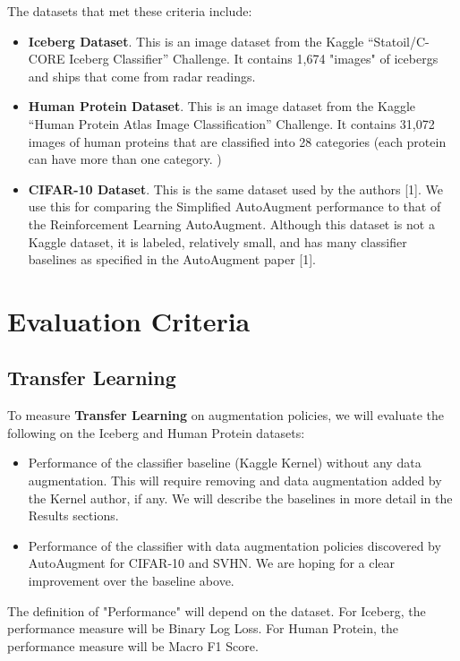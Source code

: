 \documentclass[10pt,twocolumn,letterpaper]{article}
\begin{document}
The datasets that met these criteria include:

\begin{itemize}
  \item \textbf{Iceberg Dataset}.  This is an image dataset from the Kaggle “Statoil/C-CORE Iceberg Classifier” Challenge.  It contains 1,674 "images" of icebergs and ships that come from radar readings.  
  \item \textbf{Human Protein Dataset}.  This is an image dataset from the Kaggle “Human Protein Atlas Image Classification” Challenge.   It contains 31,072 images of human proteins that are classified into 28 categories (each protein can have more than one  category. )
  \item \textbf{CIFAR-10 Dataset}.  This is the same dataset used by the authors [1].  We use this for comparing the Simplified AutoAugment performance to that of the Reinforcement Learning AutoAugment.  Although this dataset is not a Kaggle dataset, it is labeled, relatively small, and has many classifier baselines as specified in the AutoAugment paper [1].        
\end{itemize}


\section{Evaluation Criteria}

\subsection{Transfer Learning}

To measure \textbf{Transfer Learning} on augmentation policies, we will evaluate the following on the Iceberg and Human Protein datasets:

\begin{itemize}
  \item Performance of the classifier baseline (Kaggle Kernel) without any data augmentation.  This will require removing and data augmentation added by the Kernel author, if any.  We will describe the baselines in more detail in the Results sections.
  \item Performance of the classifier with data augmentation policies discovered by AutoAugment for CIFAR-10 and SVHN.  We are hoping for a clear improvement over the baseline above.
\end{itemize}

The definition of "Performance" will depend on the dataset.  For Iceberg, the performance measure will be Binary Log Loss.  For Human Protein, the performance measure will be Macro F1 Score.
\end{document}

